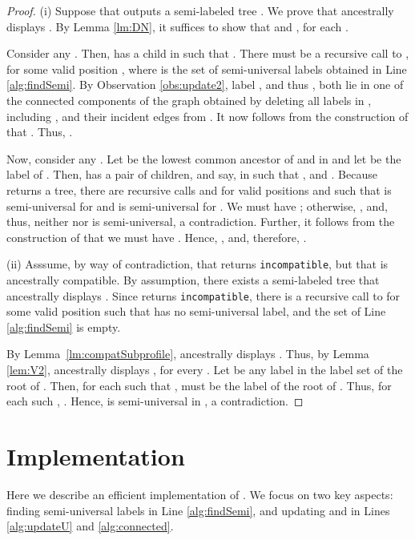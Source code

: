 \documentclass[11pt]{article}
\theoremstyle{definition}
\begin{document}
\begin{proof}
(i) Suppose that  outputs a semi-labeled tree .  We prove that  ancestrally displays . By Lemma \ref{lm:DN}, it suffices to show that  and  , for each .

Consider any .  Then,  has a child  in  such that .  There must be a recursive call to , for some valid position , where  is the set  of semi-universal labels obtained in Line \ref{alg:findSemi}.  By Observation \ref{obs:update2}, label , and thus , both lie in one of the connected components of the graph obtained by deleting all labels in , including , and their incident edges from . It now follows from the construction of  that .  Thus, .

Now, consider any .  Let  be the lowest common ancestor of  and  in  and let  be the label of . Then,  has a pair of children,  and  say, in  such that , and . Because  returns a tree, there are recursive calls  and  for valid positions  and  such that  is semi-universal for  and  is semi-universal for . We must have ; otherwise, , and, thus, neither  nor  is semi-universal, a contradiction. Further, it follows from the construction of  that we must have .  Hence, , and, therefore, .

(ii) Asssume, by way of contradiction, that  returns \texttt{incompatible}, but that  is ancestrally compatible.  By assumption, there exists a semi-labeled  tree  that ancestrally displays .  Since  returns  \texttt{incompatible}, there is a recursive call to  for some valid position  such that  has no semi-universal label, and the set  of Line \ref{alg:findSemi} is empty. 


By Lemma~\ref{lm:compatSubprofile},  ancestrally displays .  Thus, by Lemma \ref{lem:V2},  ancestrally displays , for every .  Let
 be any label in the label set of the root of .  Then, for each  such that ,  must be the label of the root of .
Thus, for each such , .  Hence,  is semi-universal in , a contradiction.
\end{proof}

\section{Implementation}\label{sec:implementation}

Here we describe an efficient implementation of .  We focus on two key aspects: finding semi-universal labels in Line \ref{alg:findSemi}, and updating  and  in Lines \ref{alg:updateU} and \ref{alg:connected}.  
\end{document}
